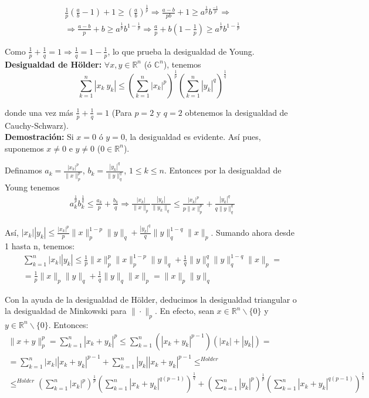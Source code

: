 \documentclass{article}
\begin{document}
\begin{itemize}
\begin{gather*}
\frac{1}{p}\left(\frac{a}{b}-1\right)+1\geq \left(\frac{a}{b}\right)^\frac{1}{p}\Rightarrow \frac{a-b}{pb}+1 \geq a^\frac{1}{p}b^\frac{-1}{p}\Rightarrow\\
\Rightarrow \frac{a-b}{p}+b\geq a^\frac{1}{p}b^{1-\frac{1}{p}}\Rightarrow \frac{a}{p}+b(1-\frac{1}{p})\geq a^\frac{1}{p}b^{1-\frac{1}{p}}
\end{gather*}

Como $\frac{1}{p}+\frac{1}{q}=1\Rightarrow \frac{1}{q}=1-\frac{1}{p}$, lo que prueba la desigualdad de Young.\\

\textbf{Desigualdad de Hölder:} $\forall x,y\in \mathbb{R}^n$ (ó $\mathbb{C}^n$), tenemos 
\begin{equation*}
\sum_{k=1}^n |x_k\:y_k|\leq \left(\sum_{k=1}^n |x_k|^p\right)^\frac{1}{p}\left(\sum_{k=1}^n |y_k|^q\right)^\frac{1}{q}
\end{equation*}

donde una vez más $\frac{1}{p}+\frac{1}{q}=1$ (Para $p=2$ y $q=2$ obtenemos la desigualdad de Cauchy-Schwarz).\\

\textbf{Demostración:} Si $x=0$ ó $y=0$, la desigualdad es evidente. Así pues, suponemos $x\neq 0$ e $y\neq 0$ ($0\in\mathbb{R}^n$).

Definamos $a_k=\frac{|x_k|^p}{\|x\|_p^p}$, $b_k=\frac{|y_k|^q}{\|y\|_q^q}$, $1\leq k\leq n$. Entonces por la desigualdad de Young tenemos
\begin{gather*}
a_k^{\frac{1}{p}}b_k^\frac{1}{q}\leq \frac{a_k}{p}+\frac{b_k}{q}\Rightarrow \frac{|x_k|}{\|x\|_p}\frac{|y_k|}{\|y_k\|_q}\leq \frac{|x_k|^p}{p\|x\|_p^p}+\frac{|y_k|^q}{q\|y\|_q^q}
\end{gather*}

Así, $|x_k||y_k|\leq \frac{|x_k|^p}{p}\|x\|_p^{1-p}\|y\|_q+\frac{|y_k|^q}{q}\|y\|_q^{1-q}\|x\|_p$. Sumando ahora desde 1 hasta n, tenemos:
\begin{gather*}
\sum_{k=1}^n|x_k||y_k|\leq \frac{1}{p}\|x\|_p^p\|x\|_p^{1-p}\|y\|_q+\frac{1}{q}\|y\|_q^q\|y\|_q^{1-q}\|x\|_p=\\
=\frac{1}{p}\|x\|_p\|y\|_q+\frac{1}{q}\|y\|_q\|x\|_p=\|x\|_p\|y\|_q
\end{gather*}

Con la ayuda de la desigualdad de Hölder, deducimos la desigualdad triangular o la desigualdad de Minkowski para $\|\cdot\|_p$. En efecto, sean $x\in \mathbb{R}^n\backslash \{0\}$ y $y\in \mathbb{R}^n\backslash \{0\}$. Entonces:
\begin{gather*}
\|x+y\|_p^p=\sum_{k=1}^n|x_k+y_k|^p\leq \sum_{k=1}^n(|x_k+y_k|^{p-1})(|x_k|+|y_k|)=\\
=\sum_{k=1}^n|x_k||x_k+y_k|^{p-1}+\sum_{k=1}^n|y_k||x_k+y_k|^{p-1}\leq^{Holder} \\
\leq^{Holder} \left(\sum_{k=1}^n|x_k|^p\right)^\frac{1}{p}\left(\sum_{k=1}^n|x_k+y_k|^{q(p-1)}\right)^\frac{1}{q}+\left(\sum_{k=1}^n|y_k|^p\right)^\frac{1}{p}\left(\sum_{k=1}^n|x_k+y_k|^{q(p-1)}\right)^\frac{1}{q}
\end{gather*}


\end{itemize}
\end{document}
